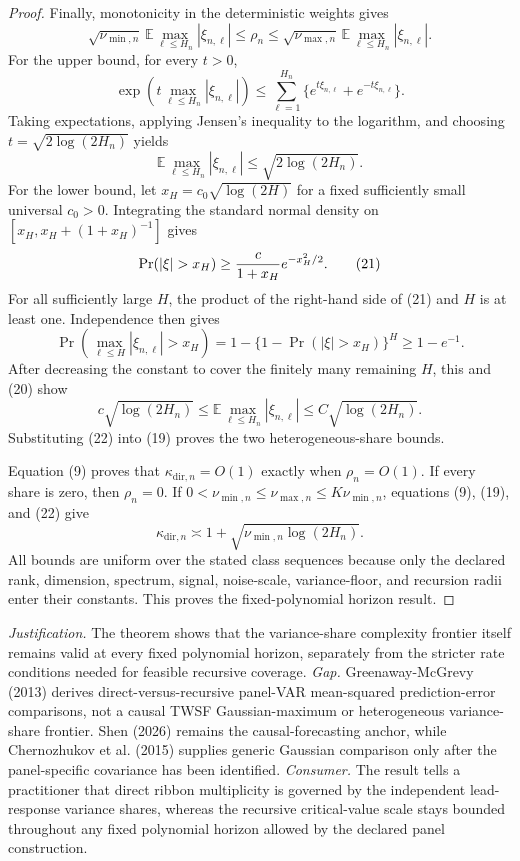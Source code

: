 \documentclass{article}
\begin{document}
\begin{proof}
Finally, monotonicity in the deterministic weights gives
\[
 \sqrt{\nu_{\min,n}}\,
 \mathbb E\max_{\ell\le H_n}|\xi_{n,\ell}|
 \le\rho_n\le
 \sqrt{\nu_{\max,n}}\,
 \mathbb E\max_{\ell\le H_n}|\xi_{n,\ell}|.
 \tag{19}
\]
For the upper bound, for every \(t>0\),
\[
 \exp\!\left(t\max_{\ell\le H_n}|\xi_{n,\ell}|\right)
 \le\sum_{\ell=1}^{H_n}
 \{e^{t\xi_{n,\ell}}+e^{-t\xi_{n,\ell}}\}.
\]
Taking expectations, applying Jensen's inequality to the logarithm, and choosing
\(t=\sqrt{2\log(2H_n)}\) yields
\[
 \mathbb E\max_{\ell\le H_n}|\xi_{n,\ell}|
 \le\sqrt{2\log(2H_n)}.
 \tag{20}
\]
For the lower bound, let \(x_H=c_0\sqrt{\log(2H)}\) for a fixed sufficiently small universal \(c_0>0\).  Integrating the standard normal density on
\([x_H,x_H+(1+x_H)^{-1}]\) gives
\[
 \Pr(|\xi|>x_H)
 \ge {c\over1+x_H}e^{-x_H^2/2}.
 \tag{21}
\]
For all sufficiently large \(H\), the product of the right-hand side of (21) and \(H\) is at least one.  Independence then gives
\[
 \Pr\!\left(\max_{\ell\le H}|\xi_{n,\ell}|>x_H\right)
 =1-\{1-\Pr(|\xi|>x_H)\}^{H}
 \ge1-e^{-1}.
\]
After decreasing the constant to cover the finitely many remaining \(H\), this and (20) show
\[
 c\sqrt{\log(2H_n)}
 \le\mathbb E\max_{\ell\le H_n}|\xi_{n,\ell}|
 \le C\sqrt{\log(2H_n)}.
 \tag{22}
\]
Substituting (22) into (19) proves the two heterogeneous-share bounds.

Equation (9) proves that \(\kappa_{\mathrm{dir},n}=O(1)\) exactly when \(\rho_n=O(1)\).  If every share is zero, then \(\rho_n=0\).  If
\(0<\nu_{\min,n}\le\nu_{\max,n}\le K\nu_{\min,n}\), equations (9), (19), and (22) give
\[
 \kappa_{\mathrm{dir},n}\asymp
 1+\sqrt{\nu_{\min,n}\log(2H_n)}.
\]
All bounds are uniform over the stated class sequences because only the declared rank, dimension, spectrum, signal, noise-scale, variance-floor, and recursion radii enter their constants.  This proves the fixed-polynomial horizon result.
\end{proof}
\par\smallskip\noindent \textit{Justification.} The theorem shows that the variance-share complexity frontier itself remains valid at every fixed polynomial horizon, separately from the stricter rate conditions needed for feasible recursive coverage. \textit{Gap.} Greenaway-McGrevy (2013) derives direct-versus-recursive panel-VAR mean-squared prediction-error comparisons, not a causal TWSF Gaussian-maximum or heterogeneous variance-share frontier. Shen (2026) remains the causal-forecasting anchor, while Chernozhukov et al. (2015) supplies generic Gaussian comparison only after the panel-specific covariance has been identified. \textit{Consumer.} The result tells a practitioner that direct ribbon multiplicity is governed by the independent lead-response variance shares, whereas the recursive critical-value scale stays bounded throughout any fixed polynomial horizon allowed by the declared panel construction.
\end{document}
